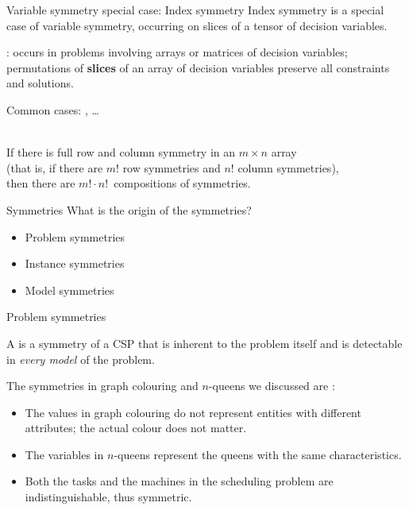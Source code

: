 \documentclass{cons-beamer}
\begin{document}
\begin{frame}{Variable symmetry special case: Index symmetry}
  Index symmetry is a special case of variable symmetry, occurring on slices of a tensor of decision variables.

  \begin{definition}
    : occurs in problems involving arrays or matrices of decision variables; permutations of \textbf{slices} of an
    array of decision variables preserve all constraints and solutions.
  \end{definition}
  \vfill

  Common cases: ,  \dots
  \vfill

   \\ If there is
  full row and column symmetry in an $m \times n$ array \\ (that is,
  if there are $m!$ row symmetries and $n!$ column symmetries), \\
  then there are $m! \cdot n!$~compositions of
  symmetries.
\end{frame}

\begin{frame}{Symmetries}
  What is the origin of the symmetries?
  \vfill

  \vfill

  \begin{itemize}
    \item Problem symmetries \vfill
    \item Instance symmetries \vfill
    \item Model symmetries
  \end{itemize}
\end{frame}

\begin{frame}{Problem symmetries}
  \begin{definition}
    A  is a symmetry of a CSP that is inherent to the problem itself and is detectable in \textit{every model} of the problem.
  \end{definition}
  \vfill

  The symmetries in graph colouring and $n$-queens we discussed are :
  \vfill

  \begin{itemize}
    \item The values in graph colouring do not represent entities with different attributes; the actual colour does not matter.
      \vfill
    \item The variables in $n$-queens represent the queens with the same characteristics.
      \vfill
    \item Both the tasks and the machines in the scheduling problem are indistinguishable, thus symmetric.
  \end{itemize}
\end{frame}
\end{document}
